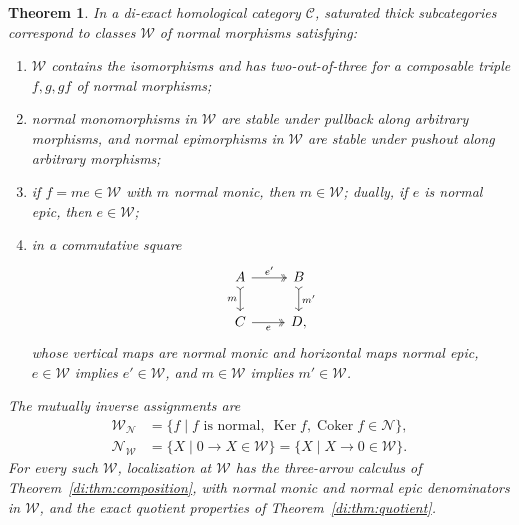 \documentclass[11pt,reqno,a4paper]{amsart}
\newtheorem{theorem}{Theorem}[section]
\theoremstyle{definition}
\theoremstyle{remark}
\newcommand{\C}{\mathcal{C}}
\newcommand{\N}{\mathcal{N}}
\newcommand{\0}{\mathbf{0}}
\renewcommand{\1}{\mathbf{1}}
\DeclareMathOperator{\Ker}{Ker}
\DeclareMathOperator{\Coker}{Coker}
\begin{document}
\begin{theorem}\label{di:thm:denominator-correspondence}
In a di-exact homological category $\C$, saturated thick subcategories
correspond to classes $\mathcal W$ of \emph{normal} morphisms satisfying:
\begin{enumerate}[label=\textup{(TF\arabic*)},leftmargin=19mm]
\item $\mathcal W$ contains the isomorphisms and has two-out-of-three
for a composable triple $f,g,gf$ of normal morphisms;
\item normal monomorphisms in $\mathcal W$ are stable under pullback
along arbitrary morphisms, and normal epimorphisms in $\mathcal W$
are stable under pushout along arbitrary morphisms;
\item if $f=me\in\mathcal W$ with $m$ normal monic, then
$m\in\mathcal W$; dually, if $e$ is normal epic, then
$e\in\mathcal W$;
\item in a commutative square
\[
\begin{tikzcd}
 A\arrow[r,two heads,"e'"]\arrow[d,tail,"m"']&
 B\arrow[d,tail,"m'"]\\
 C\arrow[r,two heads,"e"']&D,
\end{tikzcd}
\]
whose vertical maps are normal monic and horizontal maps normal epic,
$e\in\mathcal W$ implies $e'\in\mathcal W$, and
$m\in\mathcal W$ implies $m'\in\mathcal W$.
\end{enumerate}
The mutually inverse assignments are
\begin{align*}
 \mathcal W_{\N}
 &=\{f\mid f\text{ is normal},\ \Ker f,\Coker f\in\N\},\\
 \N_{\mathcal W}
 &=\{X\mid 0\to X\in\mathcal W\}
  =\{X\mid X\to0\in\mathcal W\}.
\end{align*}
For every such $\mathcal W$, localization at $\mathcal W$ has the
three-arrow calculus of Theorem~\ref{di:thm:composition}, with normal
monic and normal epic denominators in $\mathcal W$, and the exact
quotient properties of Theorem~\ref{di:thm:quotient}.
\end{theorem}
\end{document}
